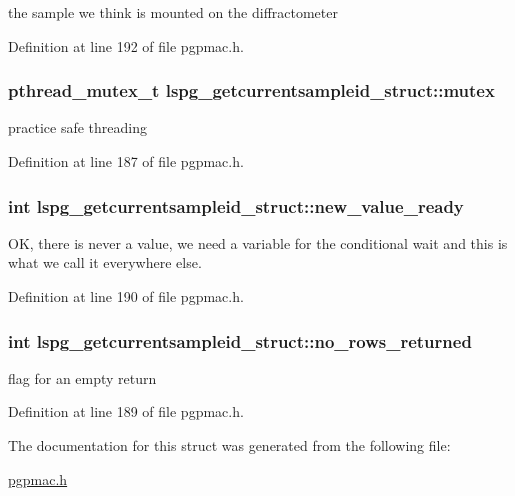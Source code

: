 the sample we think is mounted on the diffractometer 



Definition at line 192 of file pgpmac.\-h.

\hypertarget{structlspg__getcurrentsampleid__struct_ace54acbdcbce620437962858ba04e256}{
\subsubsection[{mutex}]{\setlength{\rightskip}{0pt plus 5cm}pthread\-\_\-mutex\-\_\-t lspg\-\_\-getcurrentsampleid\-\_\-struct\-::mutex}}\label{structlspg__getcurrentsampleid__struct_ace54acbdcbce620437962858ba04e256}


practice safe threading 



Definition at line 187 of file pgpmac.\-h.

\hypertarget{structlspg__getcurrentsampleid__struct_ada3840f03195ee1807150f1e75fd3775}{
\subsubsection[{new\-\_\-value\-\_\-ready}]{\setlength{\rightskip}{0pt plus 5cm}int lspg\-\_\-getcurrentsampleid\-\_\-struct\-::new\-\_\-value\-\_\-ready}}\label{structlspg__getcurrentsampleid__struct_ada3840f03195ee1807150f1e75fd3775}


O\-K, there is never a value, we need a variable for the conditional wait and this is what we call it everywhere else. 



Definition at line 190 of file pgpmac.\-h.

\hypertarget{structlspg__getcurrentsampleid__struct_a06758730db55730eb10d2d63e2520d71}{
\subsubsection[{no\-\_\-rows\-\_\-returned}]{\setlength{\rightskip}{0pt plus 5cm}int lspg\-\_\-getcurrentsampleid\-\_\-struct\-::no\-\_\-rows\-\_\-returned}}\label{structlspg__getcurrentsampleid__struct_a06758730db55730eb10d2d63e2520d71}


flag for an empty return 



Definition at line 189 of file pgpmac.\-h.



The documentation for this struct was generated from the following file\-:\begin{DoxyCompactItemize}
\item 
\hyperlink{pgpmac_8h}{pgpmac.\-h}\end{DoxyCompactItemize}
